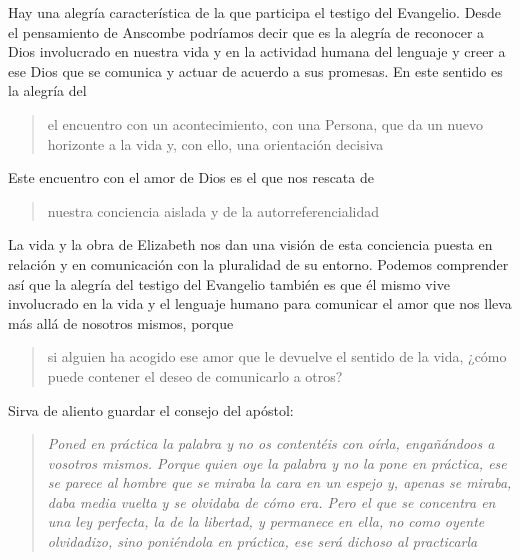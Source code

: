 Hay una alegría característica de la que participa el testigo del Evangelio. Desde el pensamiento de Anscombe podríamos decir que es la alegría de reconocer a Dios involucrado en nuestra vida y en la actividad humana del lenguaje y creer a ese Dios que se comunica y actuar de acuerdo a sus promesas. En este sentido es la alegría del \blockquote[][\,(DCE 1 ;EG 7)]{el encuentro con un acontecimiento, con una Persona, que da un nuevo horizonte a la vida y, con ello, una orientación decisiva}. Este encuentro con el amor de Dios es el que nos rescata de \blockquote[][\,(EG 8)]{nuestra conciencia aislada y de la autorreferencialidad}. La vida y la obra de Elizabeth nos dan una visión de esta conciencia puesta en relación y en comunicación con la pluralidad de su entorno. Podemos comprender así que la alegría del testigo del Evangelio también es que él mismo vive involucrado en la vida y el lenguaje humano para comunicar el amor que nos lleva más allá de nosotros mismos, porque \blockquote[][\,(Ibíd.)]{si alguien ha acogido ese amor que le devuelve el sentido de la vida, ¿cómo puede contener el deseo de comunicarlo a otros?} Sirva de aliento guardar el consejo del apóstol: \blockquote[][\,(St 1, 22-25)]{\emph{Poned en práctica la palabra y no os contentéis con oírla, engañándoos a vosotros mismos. Porque quien oye la palabra y no la pone en práctica, ese se parece al hombre que se miraba la cara en un espejo y, apenas se miraba, daba media vuelta y se olvidaba de cómo era. Pero el que se concentra en una ley perfecta, la de la libertad, y permanece en ella, no como oyente olvidadizo, sino poniéndola en práctica, ese será dichoso al practicarla}}.
